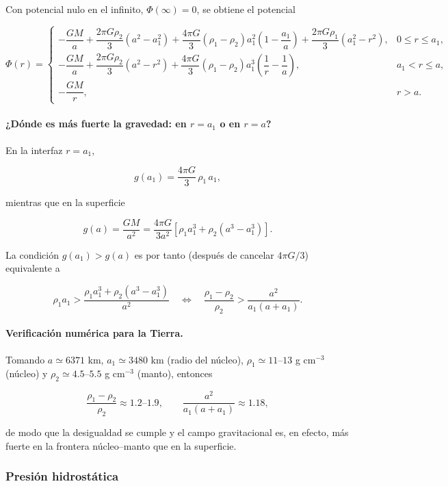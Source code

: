 Con potencial nulo en el infinito, $\Phi(\infty) = 0$, se obtiene el potencial

$$ \Phi(r) = \begin{cases} -\dfrac{GM}{a} + \dfrac{2\pi G\rho_2}{3}\left(a^2 - a_1^2\right) + \dfrac{4\pi G}{3}(\rho_1 - \rho_2)a_1^2\left(1 - \dfrac{a_1}{a}\right) + \dfrac{2\pi G\rho_1}{3}\left(a_1^2 - r^2\right), & 0 \le r \le a_1, \\[2mm] -\dfrac{GM}{a} + \dfrac{2\pi G\rho_2}{3}\left(a^2 - r^2\right) + \dfrac{4\pi G}{3}(\rho_1 - \rho_2)a_1^3\left(\dfrac{1}{r} - \dfrac{1}{a}\right), & a_1 < r \le a, \\[2mm] -\dfrac{GM}{r}, & r > a. \end{cases} $$

\paragraph{¿Dónde es más fuerte la gravedad: en $r = a_1$ o en $r = a$?} En la interfaz $r = a_1$,

$$ g(a_1) = \frac{4\pi G}{3}\,\rho_1\, a_1, $$

mientras que en la superficie

$$ g(a) = \frac{GM}{a^2} = \frac{4\pi G}{3a^2}\left[\rho_1 a_1^3 + \rho_2\left(a^3 - a_1^3\right)\right]. $$

La condición $g(a_1) > g(a)$ es por tanto (después de cancelar $4\pi G/3$) equivalente a

$$ \rho_1 a_1 > \frac{\rho_1 a_1^3 + \rho_2(a^3 - a_1^3)}{a^2} \quad\Longleftrightarrow\quad \frac{\rho_1 - \rho_2}{\rho_2} > \frac{a^2}{a_1(a + a_1)}. $$

\paragraph{Verificación numérica para la Tierra.} Tomando $a \simeq 6371$ km, $a_1 \simeq 3480$ km (radio del núcleo), $\rho_1 \simeq 11$--$13$ g cm$^{-3}$ (núcleo) y $\rho_2 \simeq 4.5$--$5.5$ g cm$^{-3}$ (manto), entonces

$$ \frac{\rho_1 - \rho_2}{\rho_2} \approx 1.2\text{--}1.9, \qquad \frac{a^2}{a_1(a + a_1)} \approx 1.18, $$

de modo que la desigualdad se cumple y el campo gravitacional es, en efecto, más fuerte en la frontera núcleo--manto que en la superficie.

\subsubsection*{Presión hidrostática}

